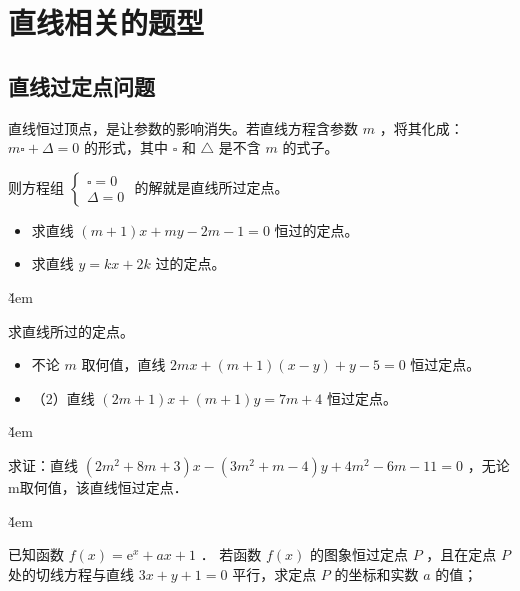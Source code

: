 \section{直线相关的题型}

\subsection{直线过定点问题}

\begin{theorem}
    直线恒过顶点，是让参数的影响消失。若直线方程含参数 $m$ ，将其化成：
    $m \square+\Delta=0$ 的形式，其中 $\square$ 和 $\triangle$ 是不含 $m$ 的式子。

    则方程组 $\left\{\begin{array}{l}\square=0 \\ \Delta=0\end{array}\right.$ 的解就是直线所过定点。
\end{theorem}

\begin{example}
    \begin{itemize}
        \item 求直线 $(m+1)x+my-2m-1=0$ 恒过的定点。
        \item 求直线 $y=kx+2k$ 过的定点。
    \end{itemize}
\end{example}

\v{4em}

\begin{example}
    求直线所过的定点。
    \begin{itemize}
        \item 不论 $m$ 取何值，直线 $2 m x+(m+1)(x-y)+y-5=0$ 恒过定点。
        \item （2）直线 $(2 m+1) x+(m+1) y=7 m+4$ 恒过定点。
    \end{itemize}
\end{example}

\v{4em}

\begin{example}
    求证：直线 $\left(2 m^2+8 m+3\right) x-\left(3 m^2+m-4\right) y+4 m^2-6 m-11=0$ ，无论m取何值，该直线恒过定点．
\end{example}

\v{4em}

\begin{example}
    已知函数 $f(x)=\mathrm{e}^x+a x+1$ ．
    若函数 $f(x)$ 的图象恒过定点 $P$ ，且在定点 $P$ 处的切线方程与直线 $3 x+y+1=0$ 平行，求定点 $P$ 的坐标和实数 $a$ 的值；
\end{example}

